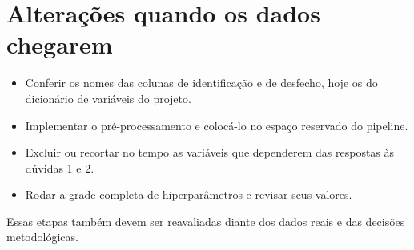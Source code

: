 \documentclass[11pt,a4paper]{article}
\begin{document}
\section{Alterações quando os dados chegarem}

\begin{itemize}
\item Conferir os nomes das colunas de identificação e de desfecho, hoje os do dicionário de variáveis do projeto.
\item Implementar o pré-processamento e colocá-lo no espaço reservado do pipeline.
\item Excluir ou recortar no tempo as variáveis que dependerem das respostas às dúvidas 1 e 2.
\item Rodar a grade completa de hiperparâmetros e revisar seus valores.
\end{itemize}

Essas etapas também devem ser reavaliadas diante dos dados reais e das decisões metodológicas.
\end{document}
